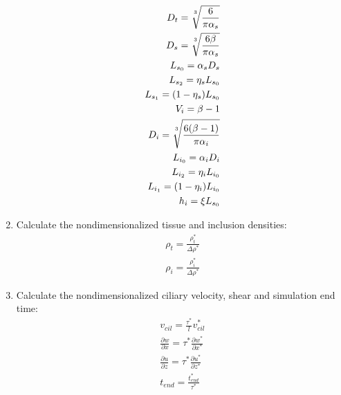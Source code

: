 \documentclass[10pt,a4paper]{article}
\def\non{\nonumber}
\def\p{\partial}
\def\l{\mathit{l}}
\begin{document}
\begin{enumerate}
	\begin{eqnarray}\label{d2ndpars4a}
		D_t = \sqrt[\uproot{5}3]{\frac{6}{\pi \alpha_s}} \non \\
		D_s = \sqrt[\uproot{5}3]{\frac{6 \beta}{\pi \alpha_s}} \non \\
		L_{s_0} = \alpha_s D_s \non \\
		L_{s_2} = \eta_s L_{s_0} \non \\
		 L_{s_1} = (1 - \eta_s) L_{s_0} \non \\
		V_i = \beta - 1 \non \\
		D_i = \sqrt[\uproot{5}3]{\frac{6 (\beta-1)}{\pi \alpha_i}} \non \\
		L_{i_0} = \alpha_i D_i \non \\
		L_{i_2} = \eta_i L_{i_0} \non \\
		 L_{i_1} = (1 - \eta_i) L_{i_0} \non \\
		h_i = \xi L_{s_0} 
	\end{eqnarray}
	\item Calculate the nondimensionalized tissue and inclusion densities:
	\begin{eqnarray}\label{d2ndpars5}
		\rho_t = \frac{\rho_t^*}{\Delta \rho^*} \non \\
		\rho_i = \frac{\rho_i^*}{\Delta \rho^*}
	\end{eqnarray}
	\item Calculate the nondimensionalized ciliary velocity, shear and simulation end time:
	\begin{eqnarray}\label{d2ndpars6}
		v_{cil} = \frac{{\tau^*}}{\l}  v^*_{cil} \non \\
		\frac{\p w}{\p x} = \tau^* \frac{\p w^*}{\p x^*} \non \\
		\frac{\p u}{\p z} = \tau^* \frac{\p u^*}{\p z^*} \non \\
		t_{end} = \frac{t^*_{end}}{\tau^*}
	\end{eqnarray}
\end{enumerate}

\newpage 
\end{document}
